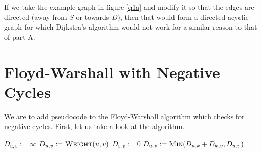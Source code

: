\documentclass{article}
\begin{document}
If we take the example graph in figure \ref{q1a} and modify it so that the edges are directed (away from \(S\) or towards \(D\)), then that would form a directed acyclic graph for which Dijkstra's algorithm would not work for a similar reason to that of part A.

\section{Floyd-Warshall with Negative Cycles}

We are to add pseudocode to the Floyd-Warshall algorithm which checks for negative cycles. First, let us take a look at the algorithm.

\begin{algorithm}
	\begin{algorithmic}
		 
		\State \(D_{u,v} := \infty\)
		\EndFor
		 
		\State \(D_{u,v} := \Call{Weight}{u, v}\)
		\EndFor
		 
		\State \(D_{v,v} := 0\)
		\EndFor
		 
		\State \(D_{u,v} := \Call{Min}{D_{u,k} + D_{k,v}, D_{u,v}}\) 
		\EndFor
		\EndFor
		\EndFor
		\EndFunction
	\end{algorithmic}
\end{algorithm}

\end{document}
